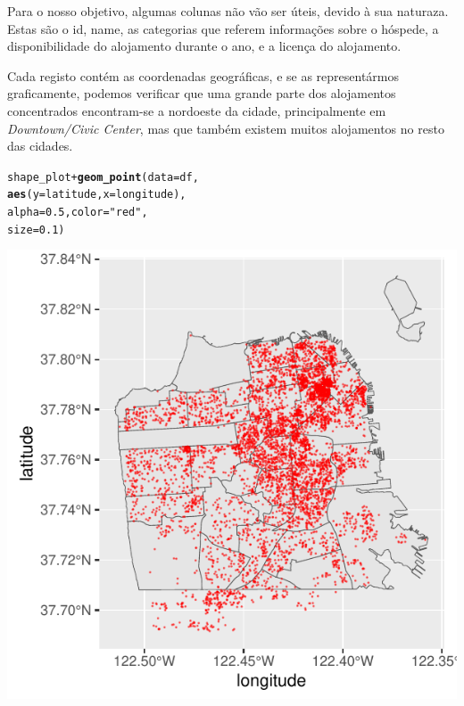 \documentclass[a4paper, justified]{tufte-handout}\usepackage[]{graphicx}\usepackage[]{xcolor}
\makeatletter
\def\maxwidth{ %
  \ifdim\Gin@nat@width>\linewidth
    \linewidth
  \else
    \Gin@nat@width
  \fi
}
\newcommand{\hlnum}[1]{\textcolor[rgb]{0.686,0.059,0.569}{#1}}%
\newcommand{\hlstr}[1]{\textcolor[rgb]{0.192,0.494,0.8}{#1}}%
\newcommand{\hlopt}[1]{\textcolor[rgb]{0,0,0}{#1}}%
\newcommand{\hlstd}[1]{\textcolor[rgb]{0.345,0.345,0.345}{#1}}%
\newcommand{\hlkwc}[1]{\textcolor[rgb]{0.333,0.667,0.333}{#1}}%
\newcommand{\hlkwd}[1]{\textcolor[rgb]{0.737,0.353,0.396}{\textbf{#1}}}%
\newenvironment{kframe}{%
 \def\at@end@of@kframe{}%
 \ifinner\ifhmode%
  \def\at@end@of@kframe{\end{minipage}}%
  \begin{minipage}{\columnwidth}%
 \fi\fi%
 \def\FrameCommand##1{\hskip\@totalleftmargin \hskip-\fboxsep
 \colorbox{shadecolor}{##1}\hskip-\fboxsep
     \hskip-\linewidth \hskip-\@totalleftmargin \hskip\columnwidth}%
 \MakeFramed {\advance\hsize-\width
   \@totalleftmargin\z@ \linewidth\hsize
   \@setminipage}}%
 {\par\unskip\endMakeFramed%
 \at@end@of@kframe}
\newenvironment{knitrout}{}{} %
\makeatother
\begin{document}
Para o nosso objetivo, algumas colunas não vão ser úteis, devido à sua naturaza. Estas são o id, name, as categorias que referem informações sobre o hóspede, a disponibilidade do alojamento durante o ano, e a licença do alojamento. 

Cada registo contém as coordenadas geográficas, e se as representármos graficamente, podemos verificar que uma grande parte dos alojamentos concentrados encontram-se a nordoeste da cidade, principalmente em \textit{Downtown/Civic Center}, mas que também existem muitos alojamentos no resto das cidades.  %
\begin{knitrout}
\color{fgcolor}\begin{kframe}
\begin{alltt}
\hlstd{shape_plot} \hlopt{+} \hlkwd{geom_point}\hlstd{(}\hlkwc{data} \hlstd{= df,}
    \hlkwd{aes}\hlstd{(}\hlkwc{y} \hlstd{= latitude,} \hlkwc{x} \hlstd{= longitude),}
    \hlkwc{alpha} \hlstd{=} \hlnum{0.5}\hlstd{,} \hlkwc{color} \hlstd{=} \hlstr{"red"}\hlstd{,}
    \hlkwc{size} \hlstd{=} \hlnum{0.1}\hlstd{)}
\end{alltt}
\end{kframe}\begin{marginfigure}
\includegraphics[width=\maxwidth]{figure/chunk-plotPlace-1} \end{marginfigure}

\end{knitrout}
\end{document}
